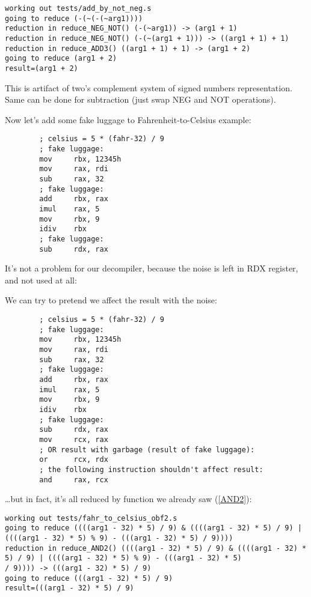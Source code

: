 \begin{lstlisting}
working out tests/add_by_not_neg.s
going to reduce (-(~(-(~arg1))))
reduction in reduce_NEG_NOT() (-(~arg1)) -> (arg1 + 1)
reduction in reduce_NEG_NOT() (-(~(arg1 + 1))) -> ((arg1 + 1) + 1)
reduction in reduce_ADD3() ((arg1 + 1) + 1) -> (arg1 + 2)
going to reduce (arg1 + 2)
result=(arg1 + 2)
\end{lstlisting}

This is artifact of two's complement system of signed numbers representation.
Same can be done for subtraction (just swap NEG and NOT operations).

Now let's add some fake luggage to Fahrenheit-to-Celsius example:

\begin{lstlisting}
        ; celsius = 5 * (fahr-32) / 9
        ; fake luggage:
        mov     rbx, 12345h
        mov     rax, rdi
        sub     rax, 32
        ; fake luggage:
        add     rbx, rax
        imul    rax, 5
        mov     rbx, 9
        idiv    rbx
        ; fake luggage:
        sub     rdx, rax
\end{lstlisting}

It's not a problem for our decompiler, because the noise is left in RDX register, and not used at all:



We can try to pretend we affect the result with the noise:

\begin{lstlisting}
        ; celsius = 5 * (fahr-32) / 9
        ; fake luggage:
        mov     rbx, 12345h
        mov     rax, rdi
        sub     rax, 32
        ; fake luggage:
        add     rbx, rax
        imul    rax, 5
        mov     rbx, 9
        idiv    rbx
        ; fake luggage:
        sub     rdx, rax
        mov     rcx, rax
        ; OR result with garbage (result of fake luggage):
        or      rcx, rdx
        ; the following instruction shouldn't affect result:
        and     rax, rcx
\end{lstlisting}

\dots but in fact, it's all reduced by  function we already saw (\ref{AND2}):

\begin{lstlisting}
working out tests/fahr_to_celsius_obf2.s
going to reduce ((((arg1 - 32) * 5) / 9) & ((((arg1 - 32) * 5) / 9) | ((((arg1 - 32) * 5) % 9) - (((arg1 - 32) * 5) / 9))))
reduction in reduce_AND2() ((((arg1 - 32) * 5) / 9) & ((((arg1 - 32) * 5) / 9) | ((((arg1 - 32) * 5) % 9) - (((arg1 - 32) * 5)
/ 9)))) -> (((arg1 - 32) * 5) / 9)
going to reduce (((arg1 - 32) * 5) / 9)
result=(((arg1 - 32) * 5) / 9)
\end{lstlisting}

